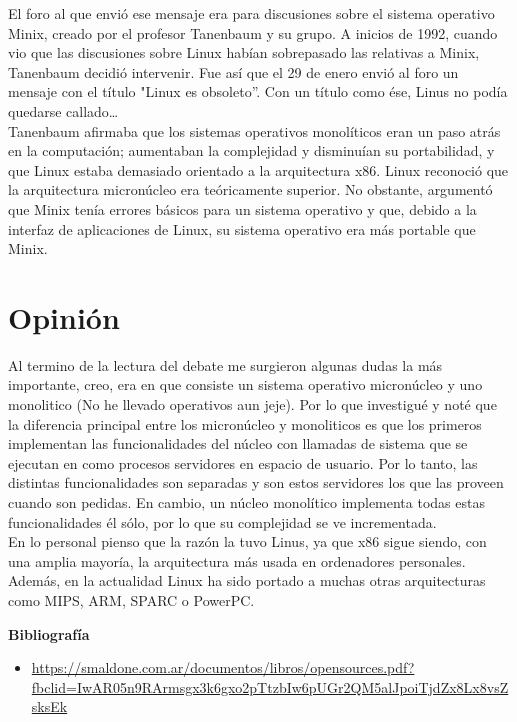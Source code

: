 \documentclass[11pt, a4paper]{report}
\begin{document}
El foro al que envió ese mensaje era para discusiones sobre el sistema
operativo Minix, creado por el profesor Tanenbaum y su grupo. A inicios de
1992, cuando vio que las discusiones sobre Linux habían sobrepasado las
relativas a Minix, Tanenbaum decidió intervenir. Fue así que el 29 de enero
envió al foro un mensaje con el título "Linux es obsoleto”. Con un título como
ése, Linus no podía quedarse callado…\\

Tanenbaum afirmaba que los sistemas operativos monolíticos eran un paso atrás
en la computación; aumentaban la complejidad y disminuían su portabilidad, y
que Linux estaba demasiado orientado a la arquitectura x86. Linux reconoció que
la arquitectura micronúcleo era teóricamente superior. No obstante, argumentó
que Minix tenía errores básicos para un sistema operativo y que, debido a la
interfaz de aplicaciones de Linux, su sistema operativo era más portable que
Minix.\\

\section*{Opinión}

Al termino de la lectura del debate me surgieron algunas dudas la más
importante, creo, era en que consiste un sistema operativo micronúcleo y uno
monolitico (No he llevado operativos aun jeje). Por lo que investigué y noté que
la diferencia principal entre los micronúcleo y monoliticos es que los primeros
implementan las funcionalidades del núcleo con llamadas de sistema que se
ejecutan en como procesos servidores en espacio de usuario. Por lo tanto, las
distintas funcionalidades son separadas y son estos servidores los que las
proveen cuando son pedidas. En cambio, un núcleo monolítico implementa todas
estas funcionalidades él sólo, por lo que su complejidad se ve incrementada.\\

En lo personal pienso que la razón la tuvo Linus, ya que x86 sigue siendo, con una amplia mayoría, la arquitectura más usada en ordenadores personales. Además, en la actualidad Linux ha sido portado a muchas otras arquitecturas como MIPS, ARM, SPARC o PowerPC.



\newpage

\textbf{Bibliografía} \\

\begin{itemize}

\item \url{https://smaldone.com.ar/documentos/libros/opensources.pdf?fbclid=IwAR05n9RArmsgx3k6gxo2pTtzbIw6pUGr2QM5alJpoiTjdZx8Lx8vsZsksEk}
  
\end{itemize}
\end{document}
